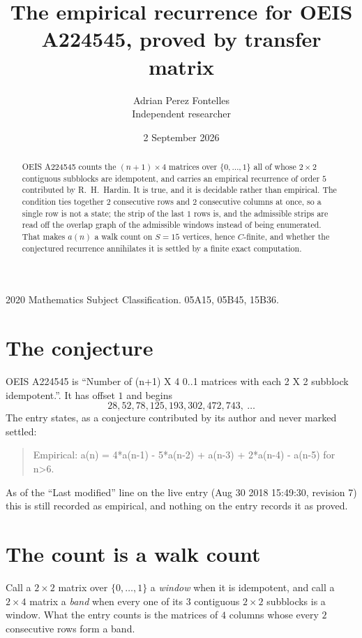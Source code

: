 \documentclass[11pt,a4paper]{article}
\title{The empirical recurrence for OEIS A224545, proved by transfer matrix}
\author{Adrian Perez Fontelles\\ \small Independent researcher}
\date{2 September 2026}
\theoremstyle{plain}
\theoremstyle{definition}
\begin{document}
\maketitle

\begin{abstract}
OEIS A224545 counts the $(n+1)\times4$ matrices over $\{0,\dots,1\}$ all of whose
$2\times2$ contiguous subblocks are idempotent, and carries an empirical recurrence of order
$5$ contributed by R.~H.~Hardin. It is true, and it is decidable rather than empirical.
The condition ties together $2$ consecutive rows and $2$ consecutive columns at once, so a
single row is not a state; the strip of the last $1$ rows is, and the admissible strips
are read off the overlap graph of the admissible windows instead of being enumerated. That
makes $a(n)$ a walk count on $S=15$ vertices, hence $C$-finite, and whether the conjectured
recurrence annihilates it is settled by a finite exact computation.
\end{abstract}

\noindent\small 2020 Mathematics Subject Classification. 05A15, 05B45, 15B36.\normalsize

\section{The conjecture}

OEIS A224545 is ``Number of (n+1) X 4 0..1 matrices with each 2 X 2 subblock idempotent.''. It has offset $1$ and begins
\[
28, 52, 78, 125, 193, 302, 472, 743,\ \dots
\]
The entry states, as a conjecture contributed by its author and never marked settled:
\begin{quote}
Empirical: a(n) = 4*a(n-1) - 5*a(n-2) + a(n-3) + 2*a(n-4) - a(n-5) for n>6.
\end{quote}
As of the ``Last modified'' line on the live entry (Aug 30 2018 15:49:30, revision 7) this is still
recorded as empirical, and nothing on the entry records it as proved.

\section{The count is a walk count}

Call a $2\times2$ matrix over $\{0,\dots,1\}$ a \emph{window} when it is idempotent, and
call a $2\times4$ matrix a \emph{band} when every one of its $3$ contiguous
$2\times2$ subblocks is a window. What the entry counts is the matrices of $4$ columns
whose every $2$ consecutive rows form a band.
\end{document}
